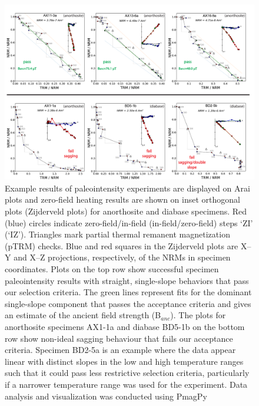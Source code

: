 \documentclass[9pt,twocolumn,twoside,lineno]{pnas-new}
\begin{document}
\begin{figure}
\noindent\includegraphics[width=17.8cm]{IZZI_examples.pdf}
\centering
\caption{\footnotesize{Example results of paleointensity experiments are displayed on Arai plots and zero-field heating results are shown on inset orthogonal plots (Zijderveld plots) for anorthosite and diabase specimens. Red (blue) circles indicate zero-field/in-field (in-field/zero-field) steps `ZI’ (`IZ’). Triangles mark partial thermal remanent magnetization (pTRM) checks. Blue and red squares in the Zijderveld plots are X–Y and X–Z projections, respectively, of the NRMs in specimen coordinates. Plots on the top row show successful specimen paleointensity results with straight, single-slope behaviors that pass our selection criteria. The green lines represent fits for the dominant single-slope component that passes the acceptance criteria and gives an estimate of the ancient field strength (B$_{anc}$). The plots for anorthosite specimens AX1-1a and diabase BD5-1b on the bottom row show non-ideal sagging behaviour that fails our acceptance criteria. Specimen BD2-5a is an example where the data appear linear with distinct slopes in the low and high temperature ranges such that it could pass less restrictive selection criteria, particularly if a narrower temperature range was used for the experiment. Data analysis and visualization was conducted using PmagPy \cite{Tauxe2016a}}}
\label{fig:IZZI_examples}
\end{figure}
\end{document}
